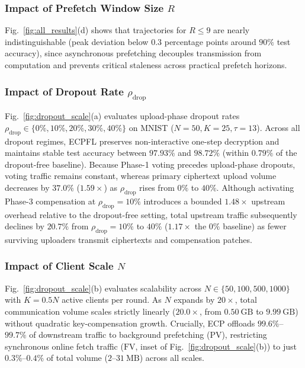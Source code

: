 \subsubsection{Impact of Prefetch Window Size $R$}
Fig.~\ref{fig:all_results}(d) shows that trajectories for $R \leq 9$ are nearly indistinguishable (peak deviation below $0.3$ percentage points around $90\%$ test accuracy), since asynchronous prefetching decouples transmission from computation and prevents critical staleness across practical prefetch horizons.

\subsubsection{Impact of Dropout Rate $\rho_{\mathrm{drop}}$}
Fig.~\ref{fig:dropout_scale}(a) evaluates upload-phase dropout rates $\rho_{\mathrm{drop}} \in \{0\%, 10\%, 20\%, 30\%, 40\%\}$ on MNIST ($N=50, K=25, \tau=13$). Across all dropout regimes, \textsc{ECPFL} preserves non-interactive one-step decryption and maintains stable test accuracy between $97.93\%$ and $98.72\%$ (within $0.79\%$ of the dropout-free baseline). Because Phase-1 voting precedes upload-phase dropouts, voting traffic remains constant, whereas primary ciphertext upload volume decreases by $37.0\%$ ($1.59\times$) as $\rho_{\mathrm{drop}}$ rises from $0\%$ to $40\%$. Although activating Phase-3 compensation at $\rho_{\mathrm{drop}}=10\%$ introduces a bounded $1.48\times$ upstream overhead relative to the dropout-free setting, total upstream traffic subsequently declines by $20.7\%$ from $\rho_{\mathrm{drop}}=10\%$ to $40\%$ ($1.17\times$ the $0\%$ baseline) as fewer surviving uploaders transmit ciphertexts and compensation patches.

\subsubsection{Impact of Client Scale $N$}
Fig.~\ref{fig:dropout_scale}(b) evaluates scalability across $N \in \{50, 100, 500, 1000\}$ with $K = 0.5N$ active clients per round. As $N$ expands by $20\times$, total communication volume scales strictly linearly ($20.0\times$, from $0.50~\mathrm{GB}$ to $9.99~\mathrm{GB}$) without quadratic key-compensation growth. Crucially, \textsc{ECP} offloads $99.6\%$--$99.7\%$ of downstream traffic to background prefetching ($\mathrm{PV}$), restricting synchronous online fetch traffic ($\mathrm{FV}$, inset of Fig.~\ref{fig:dropout_scale}(b)) to just $0.3\%$--$0.4\%$ of total volume ($2$--$31~\mathrm{MB}$) across all scales.

